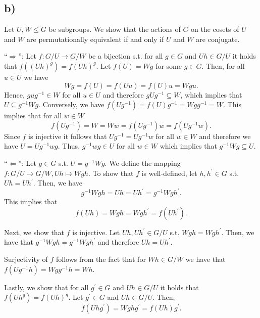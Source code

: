 \subsection*{b)}
Let $U, W \leq G$ be subgroups. We show that the actions of $G$ on the cosets of $U$ and $W$ are permutationally equivalent if and only if $U$ and $W$ are conjugate.

``$\Rightarrow$'': Let $f : G/U \rightarrow G/W$ be a bijection s.t. for all $g \in G$ and $U h \in G/U$ it holds that $f((U h)^g) = f(U h)^g$. Let $f(U) = W g$ for some $g \in G$. Then, for all $u \in U$ we have
\[ Wg = f(U) = f(Uu) = f(U)u = Wgu. \]
Hence, $gug^{-1} \in W$ for all $u \in U$ and therefore $gUg^{-1} \subseteq W$, which implies that $U \subseteq g^{-1}Wg$.
Conversely, we have $f(Ug^{-1}) = f(U)g^{-1} = Wgg^{-1} = W$. This implies that for all $w \in W$
\[ f(Ug^{-1}) = W = Ww = f(Ug^{-1})w = f(Ug^{-1}w). \]
Since $f$ is injective it follows that $Ug^{-1} = Ug^{-1}w$ for all $w \in W$ and therefore we have $U = Ug^{-1}wg$. Thus, $g^{-1}wg \in U$ for all $w \in W$ which implies that $g^{-1}Wg \subseteq U$.

``$\Leftarrow$'': Let $g \in G$ s.t. $U = g^{-1}Wg$. We define the mapping $f : G/U \rightarrow G/W, Uh \mapsto Wgh$. To show that $f$ is well-defined, let $h, h^\prime \in G$ s.t. $Uh = Uh^\prime$. Then, we have
\[ g^{-1}Wgh = Uh = Uh^\prime = g^{-1}Wgh^\prime. \]
This implies that
\[ f(Uh) = Wgh = Wgh^\prime = f(Uh^\prime). \]

Next, we show that $f$ is injective. Let $Uh, Uh^\prime \in G/U$ s.t. $Wgh = Wgh^\prime$. Then, we have that $g^{-1}Wgh = g^{-1}Wgh^\prime$ and therefore $Uh = Uh^\prime$.

Surjectivity of $f$ follows from the fact that for $Wh \in G/W$ we have that $f(Ug^{-1}h) = Wgg^{-1}h = Wh$.

Lastly, we show that for all $g^\prime \in G$ and $Uh \in G/U$ it holds that $f(Uh^g) = f(Uh)^g$. Let $g^\prime \in G$ and $Uh \in G/U$. Then,
\[ f(Uhg^\prime) = Wghg^\prime = f(Uh)g^\prime. \]